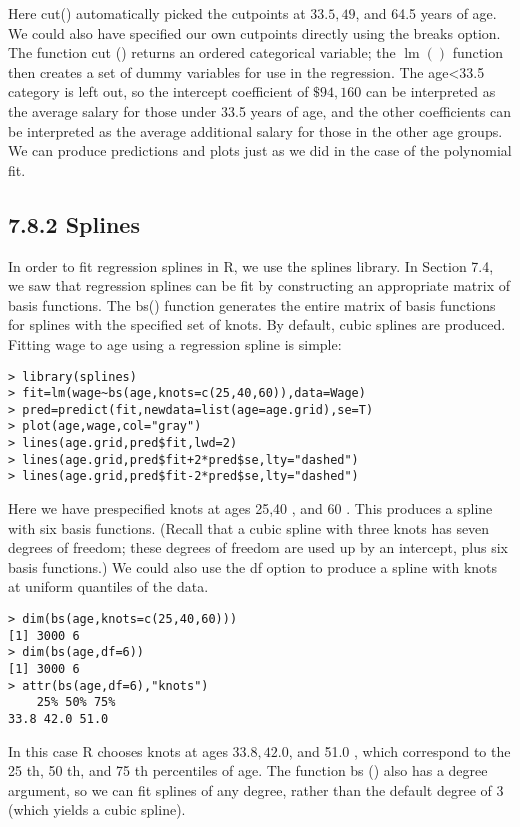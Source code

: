 \documentclass[10pt]{article}
\begin{document}
Here cut() automatically picked the cutpoints at $33.5,49$, and 64.5 years of age. We could also have specified our own cutpoints directly using the breaks option. The function cut () returns an ordered categorical variable; the $\operatorname{lm}()$ function then creates a set of dummy variables for use in the regression. The age<33.5 category is left out, so the intercept coefficient of $\$ 94,160$ can be interpreted as the average salary for those under 33.5 years of age, and the other coefficients can be interpreted as the average additional salary for those in the other age groups. We can produce predictions and plots just as we did in the case of the polynomial fit.


\subsection*{7.8.2 Splines}
In order to fit regression splines in R, we use the splines library. In Section 7.4, we saw that regression splines can be fit by constructing an appropriate matrix of basis functions. The bs() function generates the entire matrix of basis functions for splines with the specified set of knots. By default, cubic splines are produced. Fitting wage to age using a regression spline is simple:

\begin{verbatim}
> library(splines)
> fit=lm(wage~bs(age,knots=c(25,40,60)),data=Wage)
> pred=predict(fit,newdata=list(age=age.grid),se=T)
> plot(age,wage,col="gray")
> lines(age.grid,pred$fit,lwd=2)
> lines(age.grid,pred$fit+2*pred$se,lty="dashed")
> lines(age.grid,pred$fit-2*pred$se,lty="dashed")
\end{verbatim}

Here we have prespecified knots at ages 25,40 , and 60 . This produces a spline with six basis functions. (Recall that a cubic spline with three knots has seven degrees of freedom; these degrees of freedom are used up by an intercept, plus six basis functions.) We could also use the df option to produce a spline with knots at uniform quantiles of the data.

\begin{verbatim}
> dim(bs(age,knots=c(25,40,60)))
[1] 3000 6
> dim(bs(age,df=6))
[1] 3000 6
> attr(bs(age,df=6),"knots")
    25% 50% 75%
33.8 42.0 51.0
\end{verbatim}

In this case R chooses knots at ages $33.8,42.0$, and 51.0 , which correspond to the 25 th, 50 th, and 75 th percentiles of age. The function bs () also has a degree argument, so we can fit splines of any degree, rather than the default degree of 3 (which yields a cubic spline).
\end{document}

